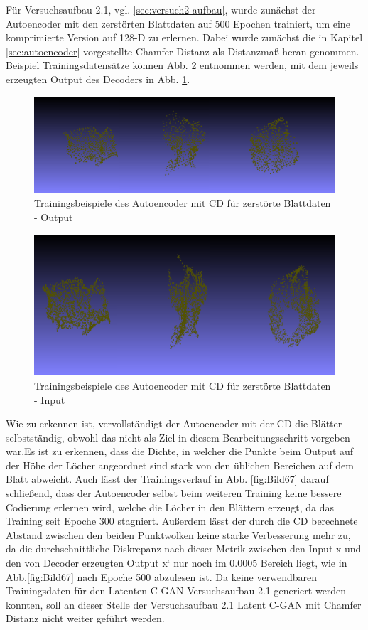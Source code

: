 \documentclass{llncs}
\begin{document}
Für Versuchsaufbau 2.1, vgl. \ref{sec:versuch2-aufbau}, wurde zunächst der Autoencoder mit den zerstörten Blattdaten auf 500 Epochen trainiert, um eine komprimierte Version auf 128-D zu erlernen. Dabei wurde zunächst die in Kapitel \ref{sec:autoencoder} vorgestellte Chamfer Distanz als Distanzmaß heran genommen. Beispiel Trainingsdatensätze können Abb. \ref{fig:Bild1003} entnommen werden, mit dem jeweils erzeugten Output des Decoders in Abb. \ref{fig:Bild68}. 
\begin{figure}[htbp] 
	\centering
	\includegraphics[width=1.0\textwidth]{autoencoder_destroyed_example_chamfer_fake.png}
	\caption{Trainingsbeispiele des Autoencoder mit CD für zerstörte Blattdaten - Output}
	\label{fig:Bild68}
\end{figure}
\begin{figure}[htbp] 
	\centering
	\includegraphics[width=1.0\textwidth]{autoencoder_destroyed_example_chamfer_real.png}
	\caption{Trainingsbeispiele des Autoencoder mit CD für zerstörte Blattdaten - Input}
	\label{fig:Bild1003}
\end{figure}
Wie zu erkennen ist, vervollständigt der Autoencoder mit der CD die Blätter selbstständig, obwohl das nicht als Ziel in diesem Bearbeitungsschritt vorgeben war.Es ist zu erkennen, dass die Dichte, in welcher die Punkte beim Output auf der Höhe der Löcher angeordnet sind stark von den üblichen Bereichen auf dem Blatt abweicht. 
Auch lässt der Trainingsverlauf in Abb. \ref{fig:Bild67} darauf schließend, dass der Autoencoder selbst beim weiteren Training keine bessere Codierung erlernen wird, welche die Löcher in den Blättern erzeugt, da das Training  seit Epoche 300 stagniert. Außerdem lässt der durch die CD berechnete Abstand zwischen den beiden Punktwolken keine starke Verbesserung mehr zu, da die durchschnittliche Diskrepanz nach dieser Metrik zwischen den Input x und den von Decoder erzeugten Output x` nur noch im 0.0005 Bereich liegt, wie in Abb.\ref{fig:Bild67} nach Epoche 500 abzulesen ist. Da keine verwendbaren Trainingsdaten für den Latenten C-GAN Versuchsaufbau 2.1 generiert werden konnten, soll an dieser Stelle der Versuchsaufbau 2.1 Latent C-GAN  mit Chamfer Distanz nicht weiter geführt werden. 
\end{document}
